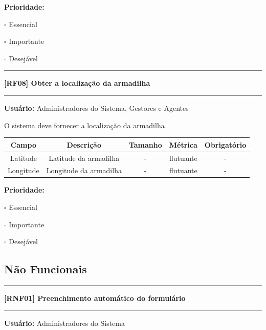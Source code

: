 \documentclass{scrreprt}
\begin{document}
	\textbf{Prioridade: }\begin{itemize*}
		\item[\hspace{1cm}\rlap{\raisebox{0.2ex}{\hspace{0.4ex}\scriptsize \ding{56}}}$\square$]
		Essencial
		\item[\hspace{1cm}$\square$]
		Importante
		\item[\hspace{1cm}$\square$]
		Desejável
	\end{itemize*}
	\begin{center}
		\noindent\rule{16cm}{0.4pt}
		\textbf{[RF08] Obter a localização da armadilha}
		\noindent\rule{16cm}{0.4pt}
	\end{center}
	\textbf{Usuário:} Administradores do Sistema, Gestores e Agentes
	
	O sistema deve fornecer a localização da armadilha
	
	\begin{center}
		\begin{adjustbox}{width=\textwidth}      \begin{tabular}{ |c|c|c|c|c| } 
			\hline
			\rowcolor{lightgray} Campo & Descrição & Tamanho & Métrica & Obrigatório \\
			\hline
			Latitude & Latitude da armadilha & - & flutuante & - \\ 
			\hline
			Longitude & Longitude da armadilha & - & flutuante & - \\ 
			\hline 
		\end{tabular}    \end{adjustbox}
	\end{center}
	
	\textbf{Prioridade: }\begin{itemize*}
		\item[\hspace{1cm}\rlap{\raisebox{0.2ex}{\hspace{0.4ex}\scriptsize \ding{56}}}$\square$]
		Essencial
		\item[\hspace{1cm}$\square$]
		Importante
		\item[\hspace{1cm}$\square$]
		Desejável
	\end{itemize*}
	
	\subsection{Não Funcionais}
	\begin{center}
		\noindent\rule{16cm}{0.4pt}
		\textbf{[RNF01] Preenchimento automático do formulário}
		\noindent\rule{16cm}{0.4pt}
	\end{center}
	\textbf{Usuário:} Administradores do Sistema
	
\end{document}
